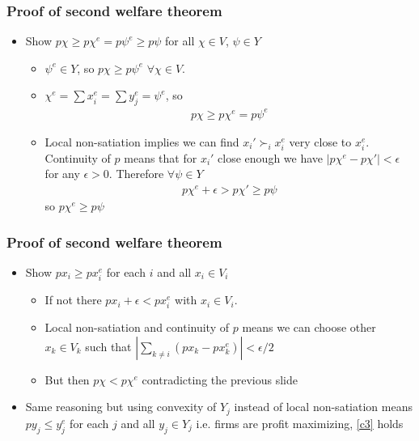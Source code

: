\documentclass[compress]{beamer}
\newcommand{\pref}{\succ}
\begin{document}
\begin{frame}
  \frametitle{Proof of second welfare theorem}
  \begin{itemize}
  \item Show $p \chi\geq p \chi^e = p \psi^e \geq p
    \psi$ for all $\chi \in V$, $\psi \in Y$
    \begin{itemize}
    \item $\psi^e \in Y$, so $p \chi \geq p \psi^e$
      $\forall \chi \in V$.
    \item $\chi^e = \sum x_i^e = \sum y_j^e = \psi^e$, so 
      \begin{align} p \chi \geq p \chi^e = p \psi^e \end{align} 
    \item Local non-satiation implies we can find $x_i' \pref_i x_i^e$
      very close to $x_i^e$. Continuity of $p$ means that for $x_i'$
      close enough we have $|p \chi^e - p\chi'| < \epsilon$ for any
      $\epsilon >0$. Therefore $\forall \psi \in Y$
      \begin{align}
        p\chi^e + \epsilon > p\chi' \geq p \psi
      \end{align}
      so $p\chi^e \geq p \psi$
    \end{itemize}  
  \end{itemize}
\end{frame}

\begin{frame}
  \frametitle{Proof of second welfare theorem}
  \begin{itemize}
  \item Show $p x_i \geq p x_i^e $ for each $i$ and
    all $x_i \in V_i$ 
    \begin{itemize}
    \item If not there $p x_i + \epsilon < p x_i^e$  with $x_i \in
      V_i$. 
    \item Local non-satiation and continuity of $p$ means we can
      choose other $x_k \in V_k$ such that $\left\vert \sum_{k\neq i}
        (p x_k - p x_k^e) \right\vert < \epsilon / 2$
    \item But then $p \chi < p \chi^e$ contradicting the previous
      slide 
    \end{itemize}
  \item Same reasoning but using convexity of $Y_j$ instead of local
    non-satiation means $p y_j \leq y_j^e$ for each $j$ and all $y_j
    \in Y_j$ i.e. firms are profit maximizing, \ref{c3} holds
  \end{itemize}
\end{frame}
\end{document}
